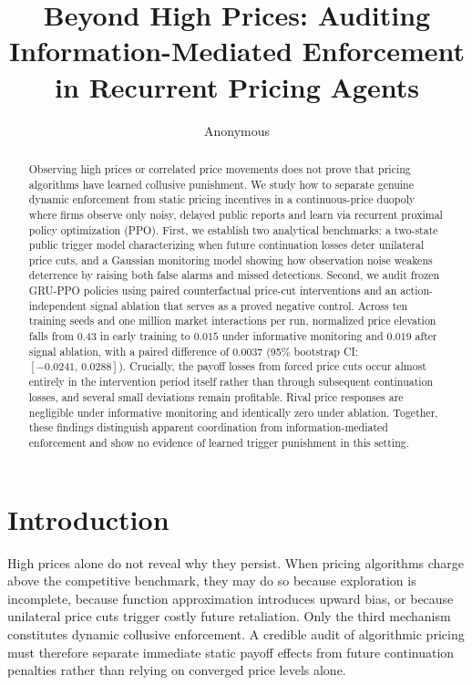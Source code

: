 \documentclass{article}
\title{Beyond High Prices: Auditing Information-Mediated Enforcement in Recurrent Pricing Agents}
\author{Anonymous}
\begin{document}
\maketitle

\begin{abstract}
Observing high prices or correlated price movements does not prove that pricing algorithms have learned collusive punishment. We study how to separate genuine dynamic enforcement from static pricing incentives in a continuous-price duopoly where firms observe only noisy, delayed public reports and learn via recurrent proximal policy optimization (PPO). First, we establish two analytical benchmarks: a two-state public trigger model characterizing when future continuation losses deter unilateral price cuts, and a Gaussian monitoring model showing how observation noise weakens deterrence by raising both false alarms and missed detections. Second, we audit frozen GRU-PPO policies using paired counterfactual price-cut interventions and an action-independent signal ablation that serves as a proved negative control. Across ten training seeds and one million market interactions per run, normalized price elevation falls from $0.43$ in early training to $0.015$ under informative monitoring and $0.019$ after signal ablation, with a paired difference of $0.0037$ (95\% bootstrap CI: $[-0.0241,\,0.0288]$). Crucially, the payoff losses from forced price cuts occur almost entirely in the intervention period itself rather than through subsequent continuation losses, and several small deviations remain profitable. Rival price responses are negligible under informative monitoring and identically zero under ablation. Together, these findings distinguish apparent coordination from information-mediated enforcement and show no evidence of learned trigger punishment in this setting.
\end{abstract}

\section{Introduction}

High prices alone do not reveal why they persist. When pricing algorithms charge above the competitive benchmark, they may do so because exploration is incomplete, because function approximation introduces upward bias, or because unilateral price cuts trigger costly future retaliation. Only the third mechanism constitutes dynamic collusive enforcement. A credible audit of algorithmic pricing must therefore separate immediate static payoff effects from future continuation penalties rather than relying on converged price levels alone.
\end{document}

